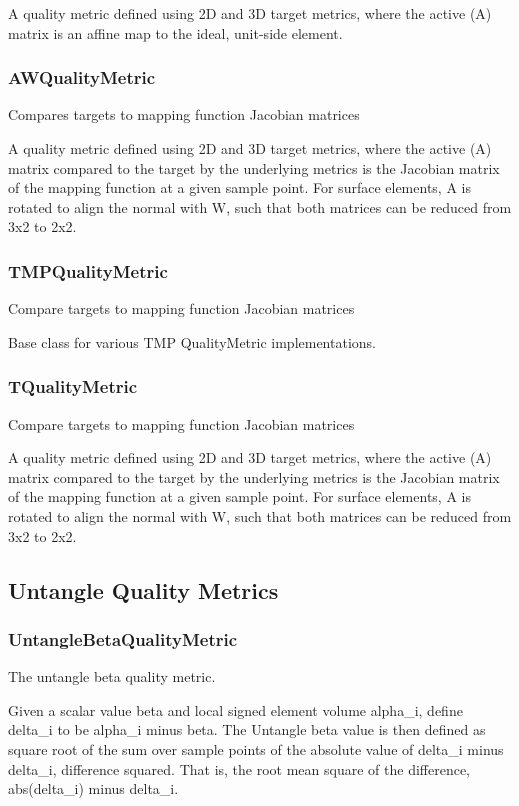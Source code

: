 A quality metric defined using 2D and 3D target metrics, where the active (A) matrix is an affine map to the ideal, unit-side element.  

\subsubsection{AWQualityMetric}

Compares targets to mapping function Jacobian matrices
 
 A quality metric defined using 2D and 3D target metrics, where the active (A) matrix compared to the target by the underlying metrics is the Jacobian matrix of the mapping function at a given sample point.  For surface elements, A is rotated to align the normal with W, such that both matrices can be reduced from 3x2 to 2x2.

\subsubsection{TMPQualityMetric}

Compare targets to mapping function Jacobian matrices
 
 Base class for various TMP QualityMetric implementations.

\subsubsection{TQualityMetric}

Compare targets to mapping function Jacobian matrices

A quality metric defined using 2D and 3D target metrics, where the active (A) matrix compared to the target by the underlying metrics is the Jacobian matrix of the mapping function at a given sample point.  For surface elements, A is rotated to align the normal with W, such that both matrices can be reduced from 3x2 to 2x2.

\subsection{Untangle Quality Metrics}

\subsubsection{UntangleBetaQualityMetric}

  The untangle beta quality metric.
       
  Given a scalar value beta and local signed element volume alpha\_i, define delta\_i to be alpha\_i minus beta.  The Untangle beta value is then defined as square root of the sum over sample points of the absolute value of delta\_i minus delta\_i, difference squared. That is, the root mean square of the difference, abs(delta\_i) minus delta\_i.

